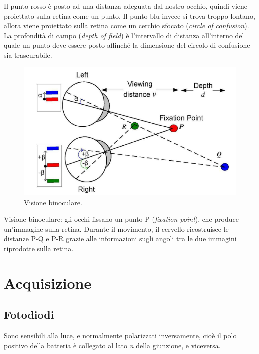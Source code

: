 \documentclass[a4paper,11pt]{article}
\begin{document}
Il punto rosso è posto ad una distanza
adeguata dal nostro occhio, quindi viene proiettato sulla retina come un punto.
Il punto blu invece si trova troppo lontano, allora viene proiettato sulla retina come
un cerchio sfocato (\textit{circle of confusion}). La profondità di campo
(\textit{depth of field}) è l'intervallo di distanza all'interno del quale un punto
deve essere posto affinché la dimensione del circolo di confusione sia trascurabile.

\renewcommand{\thefigure}{2.19}
\begin{figure}[!h]
  \centering
    \includegraphics[scale=0.5]{images/2/parallax.png}
    \caption{Visione binoculare.}
\end{figure}

Visione binoculare: gli occhi fissano un punto P (\textit{fixation point}), che produce un'immagine sulla retina. Durante il movimento, il cervello ricostruisce le distanze P-Q e P-R grazie alle
informazioni sugli angoli tra le due immagini riprodotte sulla retina.

\newpage

\section{Acquisizione}
\subsection{Fotodiodi}
Sono sensibili alla luce, e normalmente polarizzati inversamente, cioè il polo positivo
della batteria è collegato al lato \textit{n} della giunzione, e viceversa.
\end{document}
